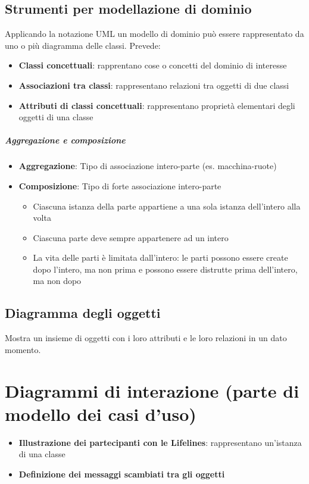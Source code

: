 \documentclass[12pt]{article}
\begin{document}
\subsection{Strumenti per modellazione di dominio}
Applicando la notazione UML un modello di dominio può essere rappresentato da uno o più diagramma delle classi. Prevede:
\begin{itemize}
    \item \textbf{Classi concettuali}: rapprentano cose o concetti del dominio di interesse
    \item \textbf{Associazioni tra classi}: rappresentano relazioni tra oggetti di due classi
    \item \textbf{Attributi di classi concettuali}: rappresentano proprietà elementari degli oggetti di una classe
\end{itemize}
\subparagraph{Aggregazione e composizione}
\begin{itemize}
    \item \textbf{Aggregazione}: Tipo di associazione intero-parte (es. macchina-ruote)
    \item \textbf{Composizione}: Tipo di forte associazione intero-parte
    \begin{itemize}
        \item Ciascuna istanza della parte appartiene a una sola istanza dell'intero alla volta
        \item Ciascuna parte deve sempre appartenere ad un intero
        \item La vita delle parti è limitata dall'intero: le parti possono essere create dopo l'intero, ma non prima e possono essere distrutte prima dell'intero, ma non dopo
    \end{itemize}
\end{itemize}
\subsection{Diagramma degli oggetti}
Mostra un insieme di oggetti con i loro attributi e le loro relazioni in un dato momento.

\section{Diagrammi di interazione (parte di modello dei casi d'uso)}
\begin{itemize}
    \item \textbf{Illustrazione dei partecipanti con le Lifelines}: rappresentano un'istanza di una classe
    \item \textbf{Definizione dei messaggi scambiati tra gli oggetti}
\end{itemize}
\end{document}
